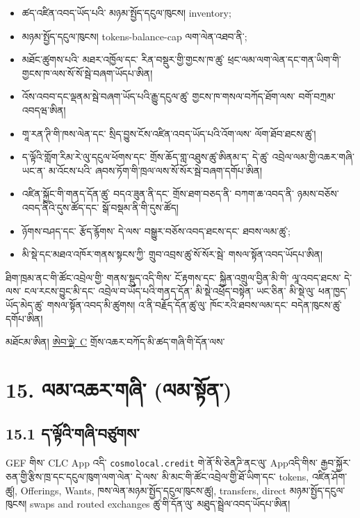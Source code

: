 \documentclass[11pt]{article}
\begin{document}
\begin{itemize}[leftmargin=*]
\item ཚད་འཛིན་འབད་ཡོད་པའི་ མཉམ་སྤྱོད་དངུལ་ཁུངས། inventory;
\item མཉམ་སྤྱོད་དངུལ་ཁུངས། tokens-balance-cap ལག་ལེན་འཐབ་ནི་;
\item མཐོང་ཚུགས་པའི་ མཐར་འཁྱོལ་དང་ རིན་བསྡུར་གྱི་གྱངས་ཁ་ཚུ་ ཕྲང་ལམ་ལག་ལེན་དང་གན་ཡིག་གི་གྱངས་ཁ་ལས་སོ་སོ་སྦེ་བཞག་ཡོདཔ་ཨིན།
\item འོས་འབབ་དང་ལྡནམ་སྦེ་བཞག་ཡོད་པའི་རྒྱུ་དངུལ་ཚུ་ གྱངས་ཁ་གསལ་བཀོད་ཐོག་ལས་ བགོ་བཀྲམ་འབདཝ་ཨིན།
\item གཱ་རན་ཊི་གི་ཁས་ལེན་དང་ སྲིད་བྱུས་ངོས་འཛིན་འབད་ཡོད་པའི་འོག་ལས་ ལོག་ཐོབ་ཐངས་ཚུ་།
\item ད་ལྟོའི་གློག་རིམ་རེ་ལུ་དངུལ་ཕོགས་དང་ གྲོས་ཆོད་གླ་འཐུས་ཚུ་ཨིནམ་ད་ དེ་ཚུ་ འབྲེལ་ལམ་གྱི་འཆར་གཞི་ ཡང་ན་ མ་འོངས་པའི་ ཞབས་ཏོག་གི་ཁྲལ་ལས་སོ་སོར་སྦེ་བཞག་དགོཔ་ཨིན།
\item འཛིན་སྐྱོང་གི་གནད་དོན་ཚུ་ བདའ་ཟུན་ནི་དང་ གྲོས་ཐག་བཅད་ནི་ བཀག་ཆ་འབད་ནི་ ཉམས་བཅོས་འབད་ནིའི་དུས་ཚོད་དང་ སྒོ་བསྡམ་ནི་གི་དུས་ཚོད།
\item ཉོགས་བཤད་དང་ རྩོད་རྙོགས་ དེ་ལས་ བསྒྱུར་བཅོས་འབད་ཐངས་དང་ ཐབས་ལམ་ཚུ་;
\item མི་སྡེ་དང་མཐའ་འཁོར་གནས་སྟངས་ཀྱི་ གྲུབ་འབྲས་ཚུ་སོ་སོར་སྦེ་ གསལ་སྟོན་འབད་ཡོདཔ་ཨིན།
\end{itemize}
ཐིག་ཁྲམ་ནང་གི་ཚོང་འབྲེལ་གྱི་ གནས་སྡུད་འདི་གིས་ ངོ་རྟགས་དང་ སྐྱིན་འགྲུལ་བྱིན་མི་གི་ ལཱ་འབད་ཐངས་ དེ་ལས་ ངལ་རངས་བྱུང་མི་དང་ འབྲེལ་བ་ཡོད་པའི་གནད་དོན་ མི་སྡེ་འཕྲོད་བསྟེན་ ཡང་ཅིན་ མི་སྡེ་ལུ་ ཕན་ཁྱད་ཡོད་མེད་ཚུ་ གསལ་སྟོན་འབད་མི་ཚུགས། འ་ནི་བརྗོད་དོན་ཚུ་ལུ་ ཁོང་རའི་ཐབས་ལམ་དང་ བདེན་ཁུངས་ཚུ་ དགོཔ་ཨིན།

མཐོངམ་ཨིན། \href{https://docs.cosmolocal.credit/dz/white-paper/appendix-c-kpi-definitions}{ཨེབ་ལྡེ་ C} གྲོས་འཆར་བཀོད་མི་ཚད་གཞི་གི་དོན་ལས་


\section*{15. ལམ་འཆར་གཞི་ (ལམ་སྟོན་)}

\subsection*{15.1 ད་ལྟོའི་གཞི་བཙུགས་}

GEF གིས་ CLC App འདི་ \texttt{cosmolocal.credit} གེ་ནོ་སི་ཅེནཌི་ནང་ལུ་ Appའདི་གིས་ རྒྱབ་སྐྱོར་ཅན་གྱི་རྩིས་ཁྲ་དང་དངུལ་ཁུག་ལག་ལེན་ དེ་ལས་ མི་མང་གི་ཚོང་འབྲེལ་གྱི་ཐོ་ཡིག་དང་ tokens, འཛིན་ཤོག་ཚུ།, Offerings, Wants, ཁས་ལེན་མཉམ་སྤྱོད་དངུལ་ཁུངས་ཚུ།, transfers, direct མཉམ་སྤྱོད་དངུལ་ཁུངས། swaps and routed exchanges ཚུ་གི་དོན་ལུ་ མཐུད་སྦྲེལ་འབད་ཡོདཔ་ཨིན།
\end{document}
